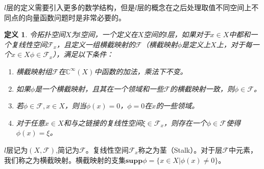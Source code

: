 \documentclass{article}
\newtheorem{definition}{定义}
\begin{document}
$l$层的定义需要引入更多的数学结构，但是$l$层的概念在之后处理取值不同空间上不同点的向量函数问题时是非常必要的。
\begin{definition}
令拓扑空间$X$为$l$空间，一个定义在$X$空间的$l$层，如果对于$x\in X$中都和一个复线性空间$\mathcal{F}_{x}$，且定义一组横截映射的$\mathcal{F}$（横截映射$\phi$是定义上$X$上，对于每一个$x\in X$$\phi\in\mathcal{F}_{x}$），满足以下条件：
\begin{enumerate}
    \item 横截映射组$\mathcal{F}$在$\mathbb{C}^{\infty}(X)$中函数的加法，乘法下不变。
    \item 如果$\phi$是一个横截映射，且其在一个领域和一些$\mathcal{F}$的横截映射一致，则$\phi\in\mathcal{F}$。
    \item 若$\phi\in \mathcal{F}, x\in X$，则当$\phi(x)=0$，$\phi=0$在$x$的一些领域。
    \item 对于任意$x\in X$和与之链接的复线性空间$\xi\in \mathcal{F}_{x}$，则存在一个$\phi\in\mathcal{F}$使得$\phi(x)=\xi$。
\end{enumerate}
\end{definition}
$l$层记为$(X,\mathcal{F})$,简记为$\mathcal{F}$。复线性空间$\mathcal{F}_{x}$称之为茎（Stalk）。对于层$\mathcal{F}$中元素，我们称之为横截映射。横截映射的支集$\mathbf{supp}\phi=\{x\in X|\phi(x)\not=0\}$。
\end{document}
